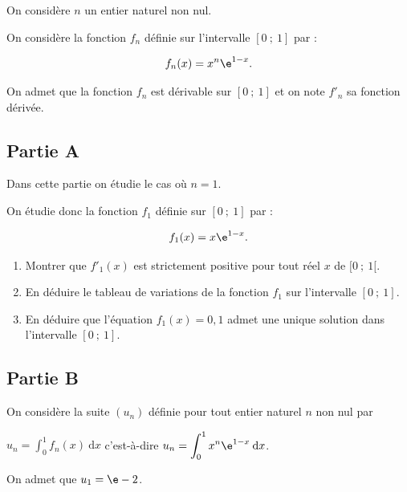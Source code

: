 On considère $n$ un entier naturel non nul.

On considère la fonction $f_n$ définie sur l’intervalle $[0~;~1]$ par :

\[f_n(x) = x^n \e^{1 - x}.\]

On admet que la fonction $f_n$ est dérivable sur $[0~;~1]$ et on note $f'_n$ sa fonction dérivée.

\subsection*{Partie A}

Dans cette partie on étudie le cas où $n = 1$.

On étudie donc la fonction $f_1$ définie sur $[0~;~1]$ par :

\[f_1(x) = x\e^{1 - x}.\]

\begin{enumerate}
\item Montrer que $f'_1(x)$ est strictement positive pour tout réel $x$ de $[0~;~1[$.
\item En déduire le tableau de variations de la fonction $f_1$ sur l'intervalle $[0~;~1]$.
\item En déduire que l'équation $f_1(x)= 0,1$ admet une unique solution dans l'intervalle $[0~;~1]$.
\end{enumerate}

\subsection*{Partie B}

On considère la suite $(u_n)$ définie pour tout entier naturel $n$ non nul par 

\begin{center}$u_n = \displaystyle\int_0^1 f_n(x) \:\text{d}x$ \quad  c'est-à-dire \quad $u_n = \displaystyle\int_0^1 x^n \e^{1-x} \: \text{d}x$.\end{center}

On admet que $u_1 = \e - 2$.

\medskip

